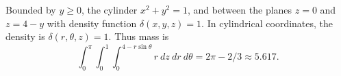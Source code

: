 {
Bounded by $y\geq 0$, the cylinder $x^2+y^2=1$, and between the planes $z=0$ and $z=4-y$ with density function $\delta(x,y,z) =1$. 
}
{In cylindrical coordinates, the density is $\delta(r,\theta,z) = 1$. Thus mass is
$$\int_0^{\pi}\int_0^1\int_0^{4-r\sin\theta} r\ dz\ dr\ d\theta = 2\pi-2/3\approx 5.617.$$
}
